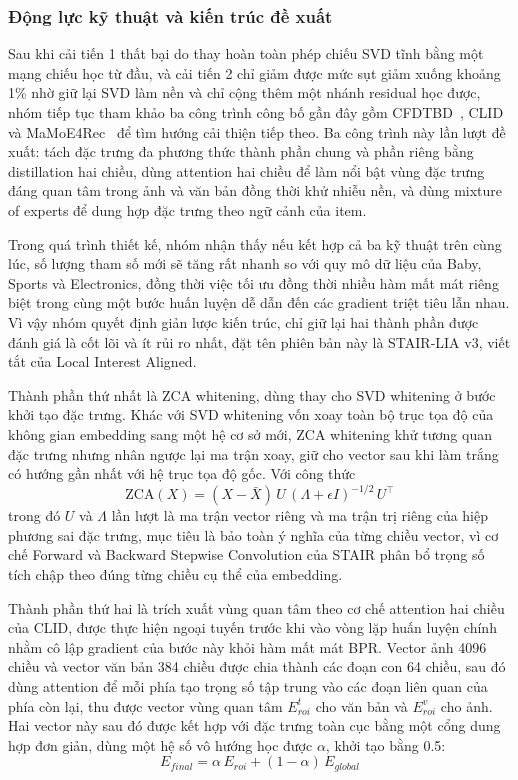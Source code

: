 \subsubsection{Động lực kỹ thuật và kiến trúc đề xuất}

Sau khi cải tiến 1 thất bại do thay hoàn toàn phép chiếu SVD tĩnh bằng một mạng chiếu học từ đầu, và cải tiến 2 chỉ giảm được mức sụt giảm xuống khoảng 1\% nhờ giữ lại SVD làm nền và chỉ cộng thêm một nhánh residual học được, nhóm tiếp tục tham khảo ba công trình công bố gần đây gồm CFDTBD~\cite{li2026cfdtbd}, CLID~\cite{qi2026clid} và MaMoE4Rec~\cite{zheng2026mamoe4rec} để tìm hướng cải thiện tiếp theo. Ba công trình này lần lượt đề xuất: tách đặc trưng đa phương thức thành phần chung và phần riêng bằng distillation hai chiều, dùng attention hai chiều để làm nổi bật vùng đặc trưng đáng quan tâm trong ảnh và văn bản đồng thời khử nhiễu nền, và dùng mixture of experts để dung hợp đặc trưng theo ngữ cảnh của item.

Trong quá trình thiết kế, nhóm nhận thấy nếu kết hợp cả ba kỹ thuật trên cùng lúc, số lượng tham số mới sẽ tăng rất nhanh so với quy mô dữ liệu của Baby, Sports và Electronics, đồng thời việc tối ưu đồng thời nhiều hàm mất mát riêng biệt trong cùng một bước huấn luyện dễ dẫn đến các gradient triệt tiêu lẫn nhau. Vì vậy nhóm quyết định giản lược kiến trúc, chỉ giữ lại hai thành phần được đánh giá là cốt lõi và ít rủi ro nhất, đặt tên phiên bản này là STAIR-LIA v3, viết tắt của Local Interest Aligned.

Thành phần thứ nhất là ZCA whitening, dùng thay cho SVD whitening ở bước khởi tạo đặc trưng. Khác với SVD whitening vốn xoay toàn bộ trục tọa độ của không gian embedding sang một hệ cơ sở mới, ZCA whitening khử tương quan đặc trưng nhưng nhân ngược lại ma trận xoay, giữ cho vector sau khi làm trắng có hướng gần nhất với hệ trục tọa độ gốc. Với công thức
\begin{equation}
\mathrm{ZCA}(X) = (X - \bar{X}) \, U \, (\Lambda + \epsilon I)^{-1/2} \, U^{\top}
\end{equation}
trong đó $U$ và $\Lambda$ lần lượt là ma trận vector riêng và ma trận trị riêng của hiệp phương sai đặc trưng, mục tiêu là bảo toàn ý nghĩa của từng chiều vector, vì cơ chế Forward và Backward Stepwise Convolution của STAIR phân bổ trọng số tích chập theo đúng từng chiều cụ thể của embedding.

Thành phần thứ hai là trích xuất vùng quan tâm theo cơ chế attention hai chiều của CLID, được thực hiện ngoại tuyến trước khi vào vòng lặp huấn luyện chính nhằm cô lập gradient của bước này khỏi hàm mất mát BPR. Vector ảnh 4096 chiều và vector văn bản 384 chiều được chia thành các đoạn con 64 chiều, sau đó dùng attention để mỗi phía tạo trọng số tập trung vào các đoạn liên quan của phía còn lại, thu được vector vùng quan tâm $E_{roi}^t$ cho văn bản và $E_{roi}^v$ cho ảnh. Hai vector này sau đó được kết hợp với đặc trưng toàn cục bằng một cổng dung hợp đơn giản, dùng một hệ số vô hướng học được $\alpha$, khởi tạo bằng 0.5:
\begin{equation}
E_{final} = \alpha \, E_{roi} + (1 - \alpha) \, E_{global}
\end{equation}

